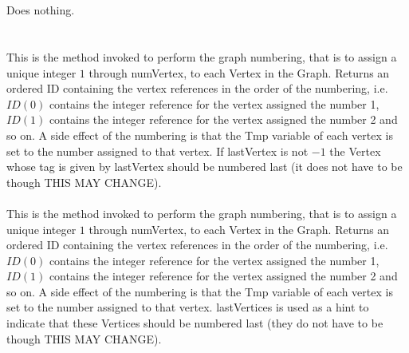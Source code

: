   \\
  \\
Does nothing. \\

  \\
\\
This is the method invoked to perform the graph numbering, that is to
assign a unique integer $1$ through \p numVertex, to each Vertex in
the Graph. Returns an ordered ID containing the vertex references in the order
of the numbering, i.e. $ID(0)$ contains the integer reference for the
vertex assigned the number 1, $ID(1)$ contains the integer reference for the
vertex assigned the number 2 and so on. A side effect of the numbering
is that the \p Tmp variable of each vertex is set to the number
assigned to that vertex. If \p lastVertex is not $-1$ the Vertex
whose tag is given by \p lastVertex should be numbered last (it
does not have to be though THIS MAY CHANGE).\\

\\
This is the method invoked to perform the graph numbering, that is to
assign a unique integer $1$ through \p numVertex, to each Vertex in
the Graph. Returns an ordered ID containing the vertex references in the order
of the numbering, i.e. $ID(0)$ contains the integer reference for the
vertex assigned the number 1, $ID(1)$ contains the integer reference for the
vertex assigned the number 2 and so on. A side effect of the numbering
is that the \p Tmp variable of each vertex is set to the number
assigned to that vertex. \p lastVertices is used as a hint to
indicate that these Vertices should be numbered last (they do not have
to be though THIS MAY CHANGE).






